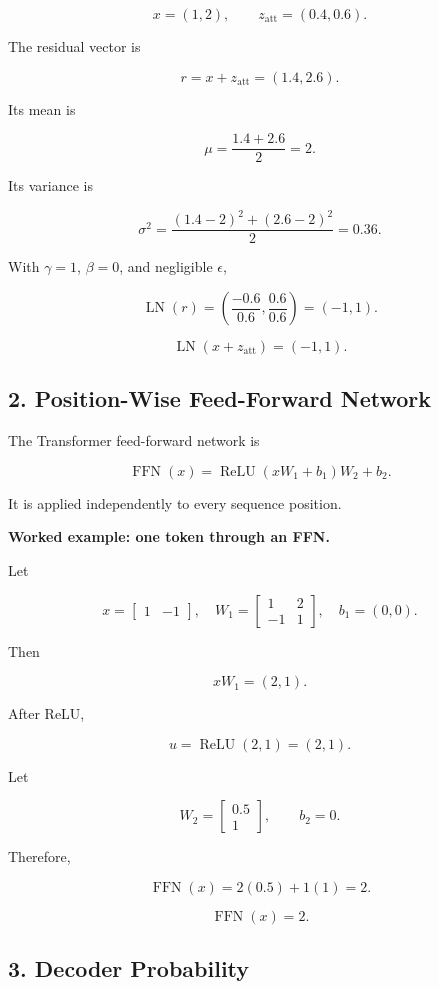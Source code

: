 \documentclass[11pt,a4paper,twoside]{article}
\begin{document}
\[
x=(1,2),
\qquad
z_{\mathrm{att}}=(0.4,0.6).
\]

The residual vector is

\[
r=x+z_{\mathrm{att}}=(1.4,2.6).
\]

Its mean is

\[
\mu=\frac{1.4+2.6}{2}=2.
\]

Its variance is

\[
\sigma^2=\frac{(1.4-2)^2+(2.6-2)^2}{2}=0.36.
\]

With $\gamma=1$, $\beta=0$, and negligible $\epsilon$,

\[
\operatorname{LN}(r)
=\left(\frac{-0.6}{0.6},\frac{0.6}{0.6}\right)
=(-1,1).
\]

\[
\boxed{\operatorname{LN}(x+z_{\mathrm{att}})=(-1,1).}
\]

\subsection*{2. Position-Wise Feed-Forward Network}

The Transformer feed-forward network is

\[
\boxed{
\operatorname{FFN}(x)
=\operatorname{ReLU}(xW_1+b_1)W_2+b_2
}.
\]

It is applied independently to every sequence position.

\textbf{Worked example: one token through an FFN.}

Let

\[
x=\begin{bmatrix}1&-1\end{bmatrix},
\quad
W_1=
\begin{bmatrix}
1&2\\
-1&1
\end{bmatrix},
\quad b_1=(0,0).
\]

Then

\[
xW_1=(2,1).
\]

After ReLU,

\[
u=\operatorname{ReLU}(2,1)=(2,1).
\]

Let

\[
W_2=\begin{bmatrix}0.5\\1\end{bmatrix},
\qquad b_2=0.
\]

Therefore,

\[
\operatorname{FFN}(x)=2(0.5)+1(1)=2.
\]

\[
\boxed{\operatorname{FFN}(x)=2.}
\]

\subsection*{3. Decoder Probability}
\end{document}
